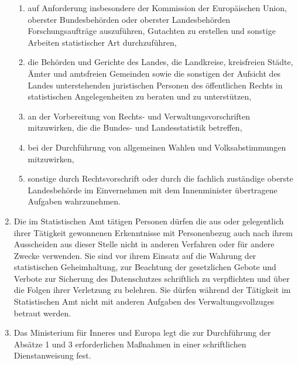 \begin{enumerate}[label=(\arabic*)]
\begin{enumerate}[label=\arabic*.]
                \item auf Anforderung insbesondere der Kommission der Europäischen Union, oberster Bundesbehörden oder oberster Landesbehörden Forschungsaufträge auszuführen, Gutachten zu erstellen und sonstige Arbeiten statistischer Art durchzuführen,
                \item die Behörden und Gerichte des Landes, die Landkreise, kreisfreien Städte, Ämter und amtsfreien Gemeinden sowie die sonstigen der Aufsicht des Landes unterstehenden juristischen Personen des öffentlichen Rechts in statistischen Angelegenheiten zu beraten und zu unterstützen,
                \item an der Vorbereitung von Rechts- und Verwaltungsvorschriften mitzuwirken, die die Bundes- und Landesstatistik betreffen,
                \item bei der Durchführung von allgemeinen Wahlen und Volksabstimmungen mitzuwirken,
                \item sonstige durch Rechtsvorschrift oder durch die fachlich zuständige oberste Landesbehörde im Einvernehmen mit dem Innenminister übertragene Aufgaben wahrzunehmen.
            \end{enumerate}
            \item Die im Statistischen Amt tätigen Personen dürfen die aus oder gelegentlich ihrer Tätigkeit gewonnenen Erkenntnisse mit Personenbezug auch nach ihrem Ausscheiden aus dieser Stelle nicht in anderen Verfahren oder für andere Zwecke verwenden. Sie sind vor ihrem Einsatz auf die Wahrung der statistischen Geheimhaltung, zur Beachtung der gesetzlichen Gebote und Verbote zur Sicherung des Datenschutzes schriftlich zu verpflichten und über die Folgen ihrer Verletzung zu belehren. Sie dürfen während der Tätigkeit im Statistischen Amt nicht mit anderen Aufgaben des Verwaltungsvollzuges betraut werden.
            \item Das Ministerium für Inneres und Europa legt die zur Durchführung der Absätze 1 und 3 erforderlichen Maßnahmen in einer schriftlichen Dienstanweisung fest.
        \end{enumerate}

